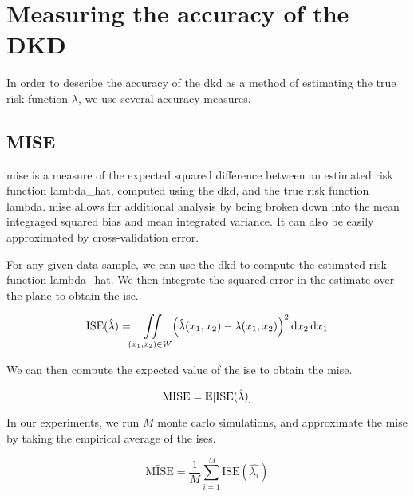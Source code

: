 \section{Measuring the accuracy of the DKD}
\label{sec:method:accuracy}

In order to describe the accuracy of the \gls{dkd} as a method of estimating the true risk function $\lambda$,
we use several accuracy measures.

\subsection{MISE}
\label{subsec:method:mise}

\Gls{mise} is a measure of the expected squared difference between an estimated risk function \gls{lambda_hat},
computed using the \gls{dkd}, and the true risk function \gls{lambda}.
\Gls{mise} allows for additional analysis by being broken down into the mean integraged squared bias and mean integrated variance.
It can also be easily approximated by cross-validation error.

For any given data sample, we can use the \gls{dkd} to compute the estimated risk function \gls{lambda_hat}.
We then integrate the squared error in the estimate over the plane to obtain the \gls{ise}.

\begin{equation}
\label{eq:ise}
    \mbox{ISE}(\hat{\lambda}) = \iint\limits_{(x_1, x_2) \in W}\!{
            \left( \hat{\lambda}(x_1, x_2) - \lambda(x_1, x_2) \right)^2
         \mathop{}\!\mathrm{d}{x_2} \mathop{}\!\mathrm{d}{x_1}}
\end{equation}

We can then compute the expected value of the \gls{ise} to obtain the \gls{mise}.

\begin{equation}
\label{eq:mise}
    \mbox{MISE} = \mathbb{E} [\mbox{ISE}(\hat{\lambda})]
\end{equation}

In our experiments, we run $M$ monte carlo simulations, and approximate the \gls{mise} by taking the empirical average of the \glspl{ise}.

\begin{equation}
\label{eq:mise_tilde}
    \widetilde{\mbox{MISE}} = \frac{1}{M} \sum_{i=1}^{M} \mbox{ISE}(\hat{\lambda_i})
\end{equation}


